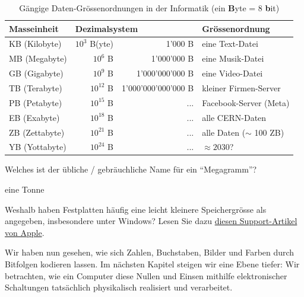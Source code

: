 \begin{table}[H]
	\centering
	\begin{tabular}{@{}l|rr|l@{}}
		\toprule
		\textbf{Masseinheit} & \multicolumn{2}{l|}{\textbf{Dezimalsystem}} & Grössenordnung                                   \\ \midrule
		KB (Kilobyte)        & $10^3$ B(yte)                               & 1'000 B             & eine Text-Datei            \\
		MB (Megabyte)        & $10^6$ B                                    & 1'000'000 B         & eine Musik-Datei           \\
		GB (Gigabyte)        & $10^9$ B                                    & 1'000'000'000 B     & eine Video-Datei           \\
		TB (Terabyte)        & $10^{12}$ B                                 & 1'000'000'000'000 B & kleiner Firmen-Server      \\
		PB (Petabyte)        & $10^{15}$ B                                 & ...                 & Facebook-Server (Meta)     \\
		EB (Exabyte)         & $10^{18}$ B                                 & ...                 & alle CERN-Daten            \\
		ZB (Zettabyte)       & $10^{21}$ B                                 & ...                 & alle Daten ($\sim$ 100 ZB) \\
		YB (Yottabyte)       & $10^{24}$ B                                 & ...                 & $\approx 2030$?            \\ \bottomrule
	\end{tabular}
	\caption{Gängige Daten-Grössenordnungen in der Informatik (ein \textbf{B}yte = 8 \textbf{b}it)}
	\label{table:daten-groessenordnungen}
\end{table}

\begin{myexercise}
	Welches ist der übliche / gebräuchliche Name für ein \enquote{Megagramm}?
	\begin{myanswer}
		eine Tonne
	\end{myanswer}
\end{myexercise}

\begin{mychallenge}
	Weshalb haben Festplatten häufig eine leicht kleinere Speichergrösse als angegeben, insbesondere unter Windows? Lesen Sie dazu \href{https://support.apple.com/en-us/102119}{diesen Support-Artikel von Apple}.
\end{mychallenge}

Wir haben nun gesehen, wie sich Zahlen, Buchstaben, Bilder und Farben durch Bitfolgen kodieren lassen. Im nächsten Kapitel steigen wir eine Ebene tiefer: Wir betrachten, wie ein Computer diese Nullen und Einsen mithilfe elektronischer Schaltungen tatsächlich physikalisch realisiert und verarbeitet.
